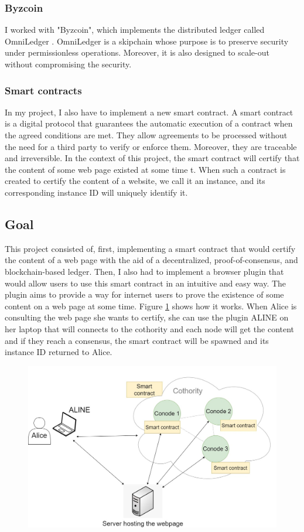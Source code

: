 \subsubsection{Byzcoin}

I worked with "Byzcoin", which implements the distributed ledger called OmniLedger \cite{omniledger}. OmniLedger is a skipchain whose purpose is to preserve security under permissionless operations. Moreover, it is also designed to scale-out without compromising the security.

\subsubsection{Smart contracts}

In my project, I also have to implement a new smart contract. A smart contract is a digital protocol that guarantees the automatic execution of a contract when the agreed conditions are met. They allow agreements to be processed without the need for a third party to verify or enforce them. Moreover, they are traceable and irreversible.
In the context of this project, the smart contract will certify that the content of some web page existed at some time t. When such a contract is created to certify the content of a website, we call it an instance, and its corresponding instance ID will uniquely identify it.

\subsection{Goal}

This project consisted of, first, implementing a smart contract that would certify the content of a web page with the aid of a decentralized, proof-of-consensus, and blockchain-based ledger. Then, I also had to implement a browser plugin that would allow users to use this smart contract in an intuitive and easy way.
The plugin aims to provide a way for internet users to prove the existence of some content on a web page at some time.
Figure \ref{fa} shows how it works. When Alice is consulting the web page she wants to certify,  she can use the plugin ALINE on her laptop that will connects to the cothority and each node will get the content and if they reach a consensus, the smart contract will be spawned and its instance ID returned to Alice.


\begin{figure}[H]
    \centering
    \includegraphics[width=1\linewidth]{images/Alice.jpg}
    \caption{ }
    \label{fa}
\end{figure}


